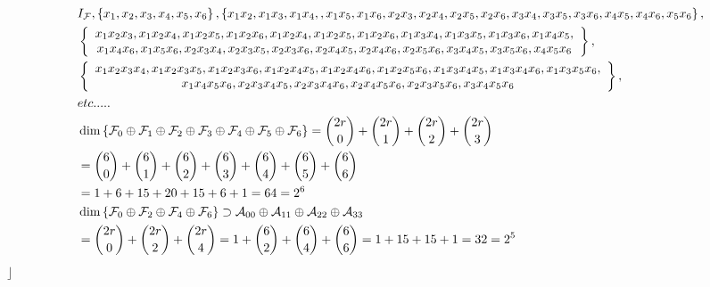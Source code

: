 \documentclass[aps,preprint]{revtex4}%
\begin{document}
\begin{align}
&  I_{\mathcal{F}},\left\{  x_{1},x_{2},x_{3},x_{4},x_{5},x_{6}\right\}
,\left\{  x_{1}x_{2},x_{1}x_{3},x_{1}x_{4},,x_{1}x_{5},x_{1}x_{6},x_{2}%
x_{3},x_{2}x_{4},x_{2}x_{5},x_{2}x_{6},x_{3}x_{4},x_{3}x_{5},x_{3}x_{6}%
,x_{4}x_{5},x_{4}x_{6},x_{5}x_{6}\right\}  ,\\
&  \left\{
\begin{array}
[c]{c}%
x_{1}x_{2}x_{3},x_{1}x_{2}x_{4},x_{1}x_{2}x_{5},x_{1}x_{2}x_{6},x_{1}%
x_{2}x_{4},x_{1}x_{2}x_{5},x_{1}x_{2}x_{6},x_{1}x_{3}x_{4},x_{1}x_{3}%
x_{5},x_{1}x_{3}x_{6},x_{1}x_{4}x_{5},\\
x_{1}x_{4}x_{6},x_{1}x_{5}x_{6},x_{2}x_{3}x_{4},x_{2}x_{3}x_{5},x_{2}%
x_{3}x_{6},x_{2}x_{4}x_{5},x_{2}x_{4}x_{6},x_{2}x_{5}x_{6},x_{3}x_{4}%
x_{5},x_{3}x_{5}x_{6},x_{4}x_{5}x_{6}%
\end{array}
\right\}  ,\\
&  \left\{
\begin{array}
[c]{c}%
x_{1}x_{2}x_{3}x_{4},x_{1}x_{2}x_{3}x_{5},x_{1}x_{2}x_{3}x_{6},x_{1}x_{2}%
x_{4}x_{5},x_{1}x_{2}x_{4}x_{6},x_{1}x_{2}x_{5}x_{6},x_{1}x_{3}x_{4}%
x_{5},x_{1}x_{3}x_{4}x_{6},x_{1}x_{3}x_{5}x_{6},\\
x_{1}x_{4}x_{5}x_{6},x_{2}x_{3}x_{4}x_{5},x_{2}x_{3}x_{4}x_{6},x_{2}x_{4}%
x_{5}x_{6},x_{2}x_{3}x_{5}x_{6},x_{3}x_{4}x_{5}x_{6}%
\end{array}
\right\}  ,\\
&  etc.....\\
&  \dim\left\{  \mathcal{F}_{0}\oplus\mathcal{F}_{1}\oplus\mathcal{F}%
_{2}\oplus\mathcal{F}_{3}\oplus\mathcal{F}_{4}\oplus\mathcal{F}_{5}%
\oplus\mathcal{F}_{6}\right\}  =\binom{2r}{0}+\binom{2r}{1}+\binom{2r}%
{2}+\binom{2r}{3}\\
&  =\binom{6}{0}+\binom{6}{1}+\binom{6}{2}+\binom{6}{3}+\binom{6}{4}+\binom
{6}{5}+\binom{6}{6}\\
&  =1+6+15+20+15+6+1=64=2^{6}\\
&  \dim\left\{  \mathcal{F}_{0}\oplus\mathcal{F}_{2}\oplus\mathcal{F}%
_{4}\oplus\mathcal{F}_{6}\right\}  \supset\mathcal{A}_{00}\oplus
\mathcal{A}_{11}\oplus\mathcal{A}_{22}\oplus\mathcal{A}_{33}\\
&  =\binom{2r}{0}+\binom{2r}{2}+\binom{2r}{4}=1+\binom{6}{2}+\binom{6}%
{4}+\binom{6}{6}=1+15+15+1=32=2^{5}%
\end{align}
$\rfloor$
\end{document}
